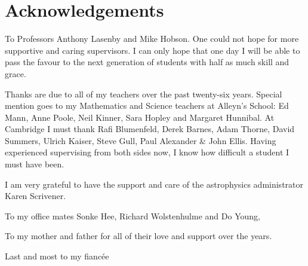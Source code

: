 \chapter*{Acknowledgements}


To Professors Anthony Lasenby and Mike Hobson. One could not hope for more supportive and caring supervisors. I can only hope that one day I will be able to pass the favour to the next generation of students with half as much skill and grace.

Thanks are due to all of my teachers over the past twenty-six years. Special mention goes to my Mathematics and Science teachers at Alleyn's School: Ed Mann, Anne Poole, Neil Kinner, Sara Hopley and Margaret Hunnibal. At Cambridge I must thank Rafi Blumenfeld, Derek Barnes, Adam Thorne, David Summers, Ulrich Kaiser, Steve Gull, Paul Alexander \& John Ellis. Having experienced supervising from both sides now, I know how difficult a student I must have been.

I am very grateful to have the support and care of the astrophysics administrator Karen Scrivener. 

To my office mates Sonke Hee, Richard Wolstenhulme and Do Young,

To my mother and father for all of their love and support over the years.

Last and most to my fianc\'{e}e

%

\cleardoublepage{}
